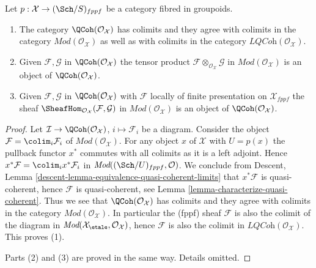 \begin{lemma}
\label{lemma-qc-colimits}
Let $p : \mathcal{X} \to (\Sch/S)_{fppf}$ be a category
fibred in groupoids.
\begin{enumerate}
\item The category $\QCoh(\mathcal{O}_\mathcal{X})$
has colimits and they agree with colimits in the category
$\textit{Mod}(\mathcal{O}_\mathcal{X})$ as well as with colimits
in the category $\textit{LQCoh}(\mathcal{O}_\mathcal{X})$.
\item Given $\mathcal{F}, \mathcal{G}$ in
$\QCoh(\mathcal{O}_\mathcal{X})$
the tensor product $\mathcal{F} \otimes_{\mathcal{O}_\mathcal{X}} \mathcal{G}$
in $\textit{Mod}(\mathcal{O}_\mathcal{X})$
is an object of $\QCoh(\mathcal{O}_\mathcal{X})$.
\item Given $\mathcal{F}, \mathcal{G}$ in
$\QCoh(\mathcal{O}_\mathcal{X})$
with $\mathcal{F}$ locally of finite presentation on
$\mathcal{X}_{fppf}$ the sheaf
$\SheafHom_{\mathcal{O}_\mathcal{X}}(\mathcal{F}, \mathcal{G})$
in $\textit{Mod}(\mathcal{O}_\mathcal{X})$
is an object of $\QCoh(\mathcal{O}_\mathcal{X})$.
\end{enumerate}
\end{lemma}

\begin{proof}
Let $\mathcal{I} \to \QCoh(\mathcal{O}_\mathcal{X})$,
$i \mapsto \mathcal{F}_i$ be a diagram.
Consider the object $\mathcal{F} = \colim_i \mathcal{F}_i$ of
$\textit{Mod}(\mathcal{O}_\mathcal{X})$.
For any object $x$ of $\mathcal{X}$ with $U = p(x)$ the pullback functor
$x^*$ commutes with all colimits as it is a left adjoint. Hence
$x^*\mathcal{F} = \colim_i x^*\mathcal{F}_i$ in
$\textit{Mod}((\Sch/U)_{fppf}, \mathcal{O})$. We conclude from
Descent, Lemma \ref{descent-lemma-equivalence-quasi-coherent-limits}
that $x^*\mathcal{F}$ is quasi-coherent, hence $\mathcal{F}$
is quasi-coherent, see
Lemma \ref{lemma-characterize-quasi-coherent}.
Thus we see that $\QCoh(\mathcal{O}_\mathcal{X})$
has colimits and they agree with colimits in the category
$\textit{Mod}(\mathcal{O}_\mathcal{X})$. In particular the (fppf) sheaf
$\mathcal{F}$ is also the colimit of the diagram in
$\textit{Mod}(\mathcal{X}_\etale, \mathcal{O}_\mathcal{X})$,
hence $\mathcal{F}$ is also the colimit in
$\textit{LQCoh}(\mathcal{O}_\mathcal{X})$. This proves (1).

\medskip\noindent
Parts (2) and (3) are proved in the same way.
Details omitted.
\end{proof}







